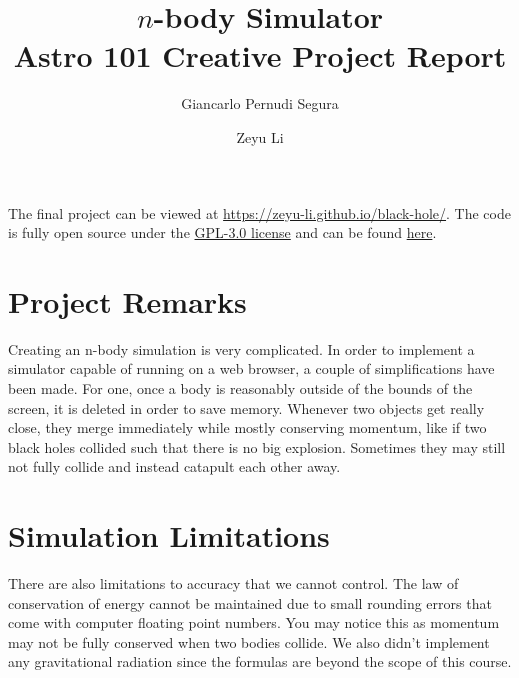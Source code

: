 \documentclass{article}
\title{%
	$n$-body Simulator \\
	\large{Astro 101 Creative Project Report}
}
\author[1]{Giancarlo Pernudi Segura}
\affil{pernudi@ualberta.ca}
\author[2]{Zeyu Li}
\affil{zeyu7@ualberta.ca}
\begin{document}
\maketitle

The final project can be viewed at \url{https://zeyu-li.github.io/black-hole/}. The code is fully open source under the \href{https://raw.githubusercontent.com/Zeyu-Li/black-hole/main/LICENSE}{GPL-3.0 license} and can be found \href{https://github.com/Zeyu-Li/black-hole}{here}.

\section{Project Remarks}
Creating an n-body simulation is very complicated. In order to implement a simulator capable of running on a web browser, a couple of simplifications have been made. For one, once a body is reasonably outside of the bounds of the screen, it is deleted in order to save memory. Whenever two objects get really close, they merge immediately while mostly conserving momentum, like if two black holes collided such that there is no big explosion. Sometimes they may still not fully collide and instead catapult each other away.

\section{Simulation Limitations}
There are also limitations to accuracy that we cannot control. The law of conservation of energy cannot be maintained due to small rounding errors that come with computer floating point numbers. You may notice this as momentum may not be fully conserved when two bodies collide. We also didn't implement any gravitational radiation since the formulas are beyond the scope of this course.
\end{document}
